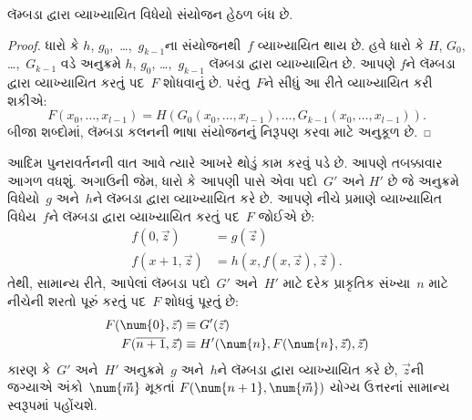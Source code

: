 \begingroup
\makeatletter{}\makeatother

\label{guunit:OLP-0352}


\begin{lem}
લૅમ્બડા દ્વારા વ્યાખ્યાયિત વિધેયો સંયોજન હેઠળ બંધ છે.
\end{lem}

\begin{proof}
ધારો કે $h$, $g_0,$ \dots,~$g_{k-1}$ના સંયોજનથી~$f$
વ્યાખ્યાયિત થાય છે. હવે ધારો કે $H$, $G_0$, \dots,~$G_{k-1}$ વડે
અનુક્રમે $h$, $g_0$, \dots,~$g_{k-1}$ લૅમ્બડા દ્વારા વ્યાખ્યાયિત છે. આપણે
$f$ને લૅમ્બડા દ્વારા વ્યાખ્યાયિત કરતું પદ~$F$ શોધવાનું છે. પરંતુ~$F$ને
સીધું આ રીતે વ્યાખ્યાયિત કરી શકીએ:
\[
F(x_0, \dots, x_{l-1}) = H(G_0(x_0, \dots, x_{l-1}),
\dots, G_{k-1}(x_0, \dots, x_{l-1})).
\]
બીજા શબ્દોમાં, લૅમ્બડા કલનની ભાષા સંયોજનનું નિરૂપણ કરવા માટે
અનુકૂળ છે.
\end{proof}
\endgroup


\begingroup
\makeatletter{}\makeatother

\label{guunit:OLP-0353}


આદિમ પુનરાવર્તનની વાત આવે ત્યારે આખરે થોડું કામ કરવું પડે છે. આપણે
તબક્કાવાર આગળ વધશું. અગાઉની જેમ, ધારો કે આપણી પાસે એવા પદો~$G'$ અને
$H'$ છે જે અનુક્રમે વિધેયો~$g$ અને~$h$ને લૅમ્બડા દ્વારા વ્યાખ્યાયિત કરે છે.
આપણે નીચે પ્રમાણે વ્યાખ્યાયિત વિધેય~$f$ને લૅમ્બડા દ્વારા વ્યાખ્યાયિત કરતું
પદ~$F$ જોઈએ છે:
\begin{align*}
f(0, \vec z) & = g(\vec z) \\
f(x+1, \vec z) & = h(x, f(x,\vec z), \vec z).
\end{align*}
તેથી, સામાન્ય રીતે, આપેલાં લૅમ્બડા પદો~$G'$ અને~$H'$ માટે દરેક
પ્રાકૃતિક સંખ્યા~$n$ માટે નીચેની શરતો પૂરું કરતું પદ~$F$ શોધવું પૂરતું છે:
\begin{align*}
F(\num{0}, \vec z) & \equiv G'(\vec z) \\
F(\overline{n+1}, \vec z) & \equiv H'(\num{n}, F(\num{n}, \vec z), \vec z)
\end{align*}
કારણ કે~$G'$ અને~$H'$ અનુક્રમે~$g$ અને~$h$ને લૅમ્બડા દ્વારા વ્યાખ્યાયિત કરે
છે, $\vec z$ની જગ્યાએ અંકો~$\num{\vec m}$ મૂકતાં
$F(\num{n+1}, \num{\vec m})$ યોગ્ય ઉત્તરનાં સામાન્ય સ્વરૂપમાં
પહોંચશે.

